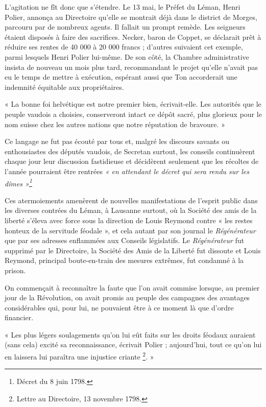 \documentclass[french,twoside]{book} %
\newenvironment{quoteblock}%
  {\begin{quoting}}
  {\end{quoting}}
\newenvironment{quotebar}{%
    \def\FrameCommand{{\color{rubric!10!}\vrule width 0.5em} \hspace{0.9em}}%
    \def\OuterFrameSep{\itemsep} %
    \MakeFramed {\advance\hsize-\width \FrameRestore}
  }%
  {%
    \endMakeFramed
  }
\renewenvironment{quoteblock}%
  {%
    \savenotes
    \setstretch{0.9}
    \begin{quotebar}
  }
  {%
    \end{quotebar}
    \spewnotes
  }
\begin{document}
L’agitation ne fît donc que s’étendre. Le 13 mai, le Préfet du Léman, Henri Polier, annonça au Directoire qu’elle se montrait déjà dans le district de Morges, parcouru par de nombreux agents. Il fallait un prompt remède. Les seigneurs étaient disposés à faire des sacrifices. Necker, baron de Coppet, se déclarait prêt à réduire ses rentes de 40 000 à 20 000 francs ; d’autres suivaient cet exemple, parmi lesquels Henri Polier lui-même. De son côté, la Chambre administrative insista de nouveau un mois plus tard, recommandant le projet qu’elle n’avait pas eu le temps de mettre à exécution, espérant aussi que Ton accorderait une indemnité équitable aux propriétaires.\par

\begin{quoteblock}
\noindent « La bonne foi helvétique est notre premier bien, écrivait-elle. Les autorités que le peuple vaudois a choisies, conserveront intact ce dépôt sacré, plus glorieux pour le nom suisse chez les autres nations que notre réputation de bravoure. »\end{quoteblock}

\noindent Ce langage ne fut pas écouté par tous et, malgré les discours savants ou enthousiastes des députés vaudois, de Secretan surtout, les conseils continuèrent chaque jour leur discussion fastidieuse et décidèrent seulement que les récoltes de l’année pourraient être rentrées \emph{« en attendant le décret qui sera rendu sur les dîmes »\footnote{Décret du 8 juin 1798.} }\par
Ces atermoiements amenèrent de nouvelles manifestations de l’esprit public dans les diverses contrées du Léman, à Lausanne surtout, où la Société des amis de la liberté s’éleva avec force sous la direction de Louis Reymond contre « les restes honteux de la servitude féodale », et cela autant par son journal le \emph{Régénérateur} que par ses adresses enflammées aux Conseils législatifs. Le \emph{Régénérateur} fut supprimé par le Directoire, la Société des Amis de la Liberté fut dissoute et Louis Reymond, principal boute-en-train des mesures extrêmes, fut condamné à la prison.\par
On commençait à reconnaître la faute que l’on avait commise lorsque, au premier jour de la Révolution, on avait promis au peuple des campagnes des avantages considérables qui, pour lui, ne pouvaient être à ce moment là que d’ordre financier.\par

\begin{quoteblock}
 \noindent « Les plus légers soulagements qu’on lui eût faits sur les droits féodaux auraient (sans cela) excité sa reconnaissance, écrivait Polier ; aujourd’hui, tout ce qu’on lui en laissera lui paraîtra une injustice criante \footnote{Lettre au Directoire, 13 novembre 1798.}. »
 \end{quoteblock}
\end{document}
